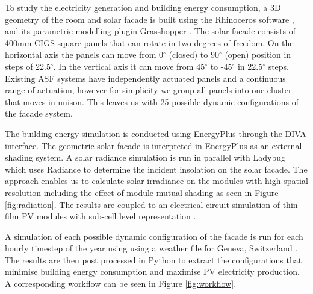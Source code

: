 
To study the electricity generation and building energy consumption, a 3D geometry of the room and solar facade is built using the Rhinoceros software \cite{Rhino}, and its parametric modelling plugin Grasshopper \cite{grasshopper}. The solar facade consists of 400mm CIGS square panels that can rotate in two degrees of freedom. On the horizontal axis the panels can move from 0$^{\circ}$ (closed) to 90$^{\circ}$ (open) position in steps of 22.5$^{\circ}$. In the vertical axis it can move from 45$^{\circ}$ to -45$^{\circ}$ in 22.5$^{\circ}$ steps. Existing ASF systems \cite{nagy2015frontiers} have independently actuated panels and a continuous range of actuation, however for simplicity we group all panels into one cluster that moves in unison. This leaves us with 25 possible dynamic configurations of the facade system. 

The building energy simulation is conducted using EnergyPlus \cite{energyplus} through the DIVA \cite{DIVA} interface. The geometric solar facade is interpreted in EnergyPlus as an external shading system. A solar radiance simulation is run in parallel with Ladybug \cite{roudsari2014ladybug}  which uses Radiance \cite{ward1994radiance} to determine the incident insolation on the solar facade. The approach enables us to calculate solar irradiance on the modules with high spatial resolution including the effect of module mutual shading as seen in Figure \ref{fig:radiation}. The results are coupled to an electrical circuit simulation of thin-film PV modules with sub-cell level representation \cite{hofer2015PVSEC}.

A simulation of each possible dynamic configuration of the facade is run for each hourly timestep of the year using using a weather file for Geneva, Switzerland \cite{genevaweatherfile}. The results are then post processed in Python \cite{python} to extract the configurations that minimise building energy consumption and maximise PV electricity production. A corresponding workflow can be seen in Figure \ref{fig:workflow}. 





